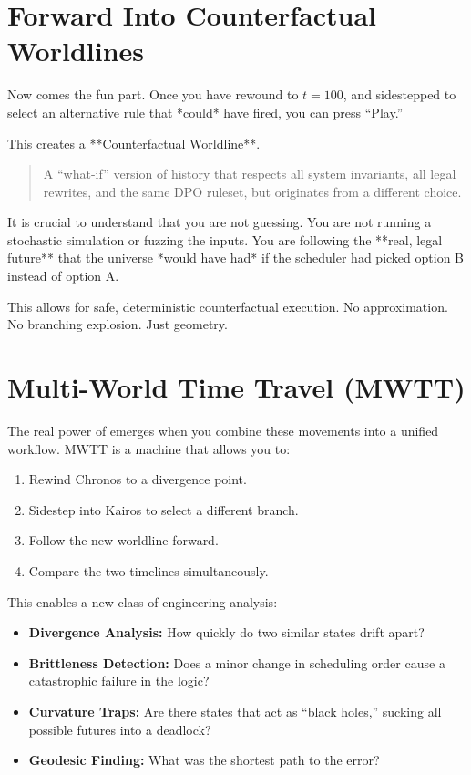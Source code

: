 \section{Forward Into Counterfactual Worldlines}

Now comes the fun part. Once you have rewound to $t=100$, and sidestepped to select an alternative rule that *could* have fired, you can press ``Play.''

This creates a **Counterfactual Worldline**.

\begin{quote}
A ``what-if'' version of history that respects all system invariants, all legal rewrites, and the same DPO ruleset, but originates from a different choice.
\end{quote}

It is crucial to understand that you are not guessing. You are not running a stochastic simulation or fuzzing the inputs. You are following the **real, legal future** that the universe *would have had* if the scheduler had picked option B instead of option A.

This allows for safe, deterministic counterfactual execution. No approximation. No branching explosion. Just geometry.

\section{Multi-World Time Travel (MWTT)}

The real power of \COMPUTER{} emerges when you combine these movements into a unified workflow. MWTT is a machine that allows you to:
\begin{enumerate}
    \item Rewind Chronos to a divergence point.
    \item Sidestep into Kairos to select a different branch.
    \item Follow the new worldline forward.
    \item Compare the two timelines simultaneously.
\end{enumerate}

This enables a new class of engineering analysis:
\begin{itemize}
    \item \textbf{Divergence Analysis:} How quickly do two similar states drift apart?
    \item \textbf{Brittleness Detection:} Does a minor change in scheduling order cause a catastrophic failure in the logic?
    \item \textbf{Curvature Traps:} Are there states that act as ``black holes,'' sucking all possible futures into a deadlock?
    \item \textbf{Geodesic Finding:} What was the shortest path to the error?
\end{itemize}

